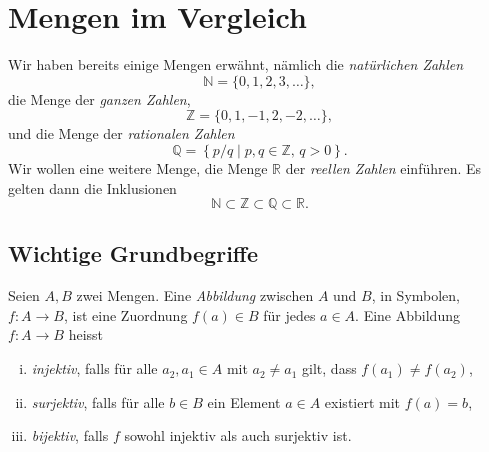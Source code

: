 \documentclass[../main.tex]{subfiles}
\begin{document}
\section{Mengen im Vergleich}
Wir haben bereits einige Mengen erwähnt, nämlich die \emph{natürlichen Zahlen}
\[ \mathbb N = \{0, 1, 2, 3, \dots\},\]
die Menge der \emph{ganzen Zahlen},
\[ \mathbb Z = \{0, 1, -1, 2, -2, \dots\},\]
und die Menge der \emph{rationalen Zahlen}
\[ \mathbb Q = \left\{p/q \mid p, q \in \mathbb Z, \, q > 0\right\}.\]
Wir wollen eine weitere Menge, die Menge $\mathbb R$ der \emph{reellen Zahlen}
einführen. Es gelten dann die Inklusionen
\[\mathbb N \subset \mathbb Z \subset \mathbb Q \subset \mathbb R.\]

\subsection*{Wichtige Grundbegriffe}
\begin{definition}
  Seien $A, B$ zwei Mengen.
  Eine \emph{Abbildung} zwischen $A$ und $B$,
  in Symbolen, $f \colon A \to B$, ist eine Zuordnung
  $f(a) \in B$ für jedes $a \in A$.
  Eine Abbildung $f \colon A \to B$ heisst
  \begin{enumerate}[(i)]
    \item \emph{injektiv}, falls für alle $a_{2}, a_{1} \in A$
      mit $a_{2} \ne a_{1}$ gilt, dass $f(a_{1}) \neq f(a_{2})$,
    \item \emph{surjektiv}, falls für alle $b \in B$ ein Element
      $a \in A$ existiert mit $f(a) = b$,
      \item \emph{bijektiv}, falls $f$ sowohl injektiv als auch surjektiv ist.
  \end{enumerate}
\end{definition}
\end{document}
